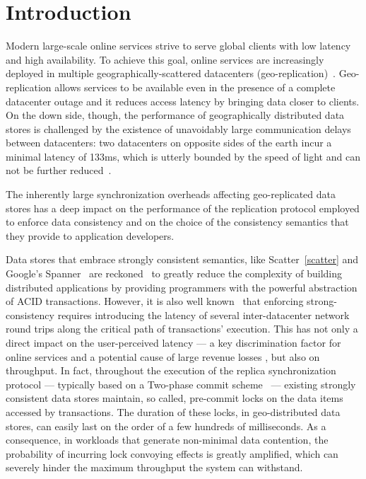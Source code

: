\section{Introduction}
\label{sec:introduction}

Modern large-scale online services strive to serve global clients with low latency and high availability. To achieve this goal, online services are increasingly deployed in multiple geographically-scattered datacenters (geo-replication)~\cite{spanner, kraska2013mdcc, li2012making}. Geo-replication allows services to be available even in the presence of a complete datacenter outage and it reduces access latency by bringing data closer to clients. On the down side, though, the performance of geographically distributed data stores is challenged by the existence of unavoidably large communication delays between datacenters: two datacenters on opposite sides of the earth incur a minimal latency of 133ms, which is utterly bounded by the speed of light and can not be further reduced~\cite{bailis2013highly}. 

The inherently large synchronization overheads affecting geo-replicated data stores has a deep impact on the performance of the replication protocol employed to enforce data consistency and on the choice of the consistency semantics that they provide to application developers.  

Data stores that embrace strongly consistent semantics, like Scatter~\ref{scatter} and Google's Spanner~\cite{spanner} are reckoned~\cite{shute2012f1} to greatly reduce the complexity of building distributed applications by providing programmers with the powerful abstraction of ACID transactions. However, it is also well known~\cite{cap-theorem}  that enforcing strong-consistency requires introducing the latency of several inter-datacenter network round trips along the critical path of transactions' execution. This has not only a direct impact on the user-perceived latency --- a key discrimination factor for online services and a potential cause of large revenue losses  \cite{schurman2009user}, but also on throughput. In fact, throughout the execution of the replica synchronization protocol --- typically based on a Two-phase commit scheme~\cite{spanner,peluso2012score} --- existing strongly consistent data stores maintain, so called, pre-commit locks on the data items accessed by transactions. The duration of these locks, in geo-distributed data stores, can easily last on the order of a few hundreds of milliseconds. As a consequence, in workloads that generate non-minimal data contention, the probability of incurring lock convoying effects is greatly amplified, which can severely hinder the maximum throughput the system can withstand.

